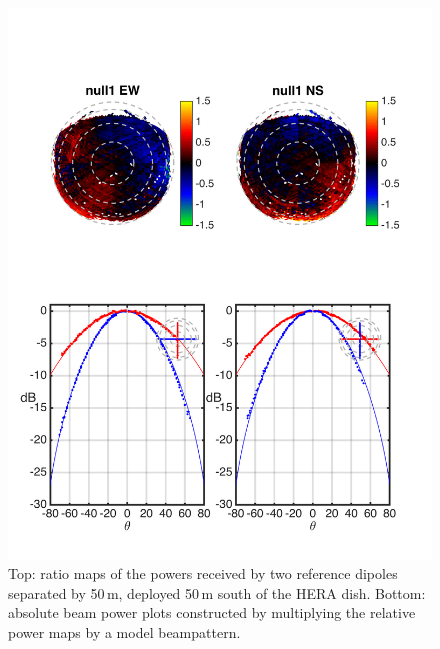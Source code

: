 \documentclass{emulateapj}
\begin{document}
\begin{figure}[h]
\includegraphics[width=6.5in]{null1_rel.png}
\caption{Top: ratio maps of the powers received by two reference dipoles separated by 50\,m, deployed 50\,m south of the HERA dish. Bottom: absolute beam power plots constructed by multiplying the relative power maps by a model beampattern. }
\label{fig:null1}
\end{figure}
\end{document}
